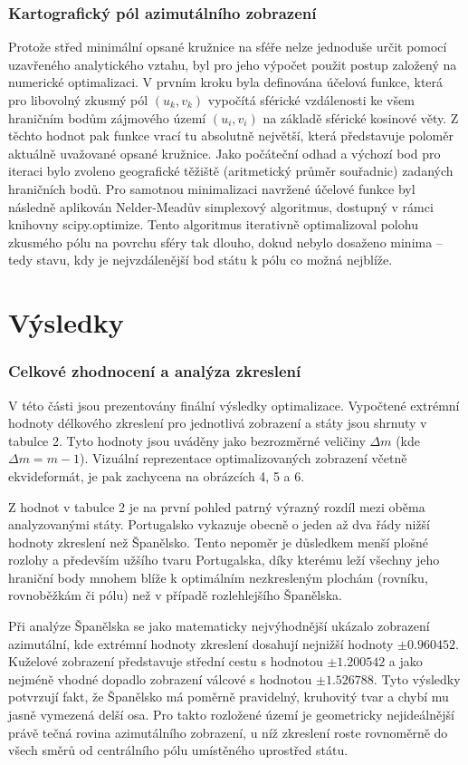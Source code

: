 \documentclass[12pt]{article}
\begin{document}
\subsubsection*{Kartografický pól azimutálního zobrazení}
Protože střed minimální opsané kružnice na sféře nelze jednoduše určit pomocí uzavřeného analytického vztahu, byl pro jeho výpočet použit postup založený na numerické optimalizaci. V prvním kroku byla definována účelová funkce, která pro libovolný zkusmý pól $(u_k, v_k)$ vypočítá sférické vzdálenosti ke všem hraničním bodům zájmového území $(u_i, v_i)$ na základě sférické kosinové věty. Z těchto hodnot pak funkce vrací tu absolutně největší, která představuje poloměr aktuálně uvažované opsané kružnice. Jako počáteční odhad a výchozí bod pro iteraci bylo zvoleno geografické těžiště (aritmetický průměr souřadnic) zadaných hraničních bodů. Pro samotnou minimalizaci navržené účelové funkce byl následně aplikován Nelder-Meadův simplexový algoritmus, dostupný v rámci knihovny scipy.optimize. Tento algoritmus iterativně optimalizoval polohu zkusmého pólu na povrchu sféry tak dlouho, dokud nebylo dosaženo minima – tedy stavu, kdy je nejvzdálenější bod státu k pólu co možná nejblíže. 
\newpage
\section{Výsledky}
\subsubsection*{Celkové zhodnocení a analýza zkreslení}

V této části jsou prezentovány finální výsledky optimalizace. Vypočtené extrémní hodnoty délkového zkreslení pro jednotlivá zobrazení a státy jsou shrnuty v tabulce 2. Tyto hodnoty jsou uváděny jako bezrozměrné veličiny $\Delta m$ (kde $\Delta m = m - 1$). Vizuální reprezentace optimalizovaných zobrazení včetně ekvideformát, je pak zachycena na obrázcích 4, 5 a 6.

Z hodnot v tabulce 2 je na první pohled patrný výrazný rozdíl mezi oběma analyzovanými státy. Portugalsko vykazuje obecně o jeden až dva řády nižší hodnoty zkreslení než Španělsko. Tento nepoměr je důsledkem menší plošné rozlohy a především užšího tvaru Portugalska, díky kterému leží všechny jeho hraniční body mnohem blíže k optimálním nezkresleným plochám (rovníku, rovnoběžkám či pólu) než v případě rozlehlejšího Španělska.

Při analýze Španělska se jako matematicky nejvýhodnější ukázalo zobrazení azimutální, kde extrémní hodnoty zkreslení dosahují nejnižší hodnoty $\pm 0.960452$. Kuželové zobrazení představuje střední cestu s hodnotou $\pm 1.200542$ a jako nejméně vhodné dopadlo zobrazení válcové s hodnotou $\pm 1.526788$. Tyto výsledky potvrzují fakt, že Španělsko má poměrně pravidelný, kruhovitý tvar a chybí mu jasně vymezená delší osa. Pro takto rozložené území je geometricky nejideálnější právě tečná rovina azimutálního zobrazení, u níž zkreslení roste rovnoměrně do všech směrů od centrálního pólu umístěného uprostřed státu.
\end{document}
